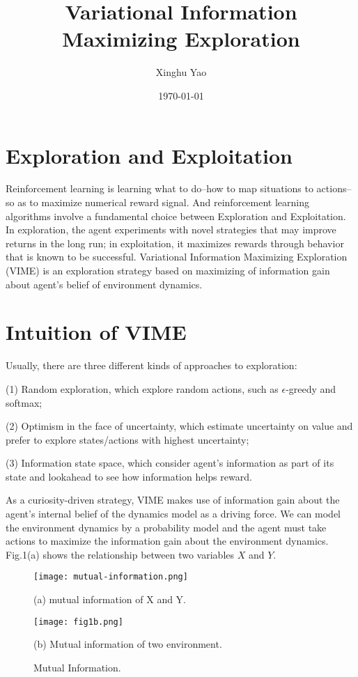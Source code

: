 \documentclass{article}
\title{Variational Information Maximizing Exploration}
\author{Xinghu Yao}
\date{\today}
\begin{document}
	\maketitle
	\section{Exploration and Exploitation}
	Reinforcement learning is learning what to do--how to map situations to actions--so as to maximize numerical reward signal. And reinforcement learning algorithms involve a fundamental choice between Exploration and Exploitation. In exploration, the agent experiments with novel strategies that may improve returns in the long run; in exploitation, it maximizes rewards through behavior that is known to be successful. Variational Information Maximizing Exploration (VIME) is an exploration strategy based on maximizing of information gain about agent's belief of environment dynamics.
	\section{Intuition of VIME}
	Usually, there are three different kinds of approaches to exploration:
	
	\noindent(1) Random exploration, which explore random actions, such as $\epsilon$-greedy and softmax;
	
	\noindent(2) Optimism in the face of uncertainty, which estimate uncertainty on value and prefer to explore states/actions with highest uncertainty;
	
	\noindent(3) Information state space, which consider agent's information as part of its state and lookahead to see how information helps reward.
	
	\noindent As a curiosity-driven strategy, VIME makes use of information gain about the agent's internal belief of the dynamics model as a driving force. We can model the environment dynamics by a probability model and the agent must take actions to  maximize the information gain about the environment dynamics. Fig.1(a) shows the relationship between two variables $X$ and $Y$.  
	
	\begin{figure}[h]
		\begin{minipage}[t]{0.5\linewidth}%
			\centering
			\texttt{[image: mutual-information.png]}
			\caption*{(a) mutual information of X and Y.}
		\end{minipage}\label{fig1}
		\begin{minipage}[t]{0.5\linewidth}%
			\centering
			\texttt{[image: fig1b.png]}
			\caption*{(b) Mutual information of two environment.}
			\label{fig2}
		\end{minipage}
		\caption{Mutual Information.}%
	\end{figure}
	
\end{document}

